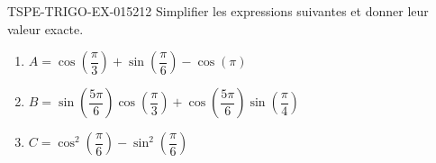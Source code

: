 \begin{exercice}{TSPE-TRIGO-EX-015}{2}{12}
Simplifier les expressions suivantes et donner leur valeur exacte.
\begin{enumerate}
  \item $A = \cos\!\left(\dfrac{\pi}{3}\right) + \sin\!\left(\dfrac{\pi}{6}\right) - \cos(\pi)$
  \item $B = \sin\!\left(\dfrac{5\pi}{6}\right)\cos\!\left(\dfrac{\pi}{3}\right) + \cos\!\left(\dfrac{5\pi}{6}\right)\sin\!\left(\dfrac{\pi}{4}\right)$
  \item $C = \cos^2\!\left(\dfrac{\pi}{6}\right) - \sin^2\!\left(\dfrac{\pi}{6}\right)$
\end{enumerate}
\end{exercice}
